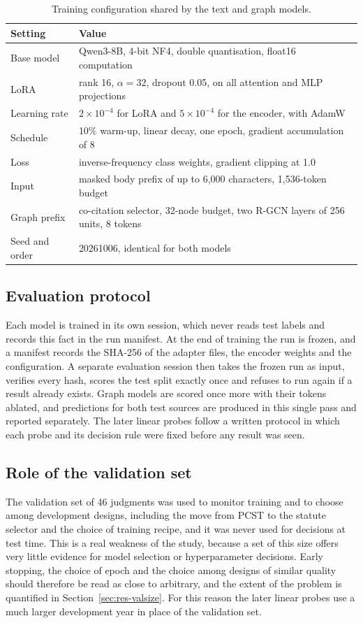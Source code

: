 \documentclass[journal]{IEEEtran}
\begin{document}
\begin{table}[!t]\centering\footnotesize
\caption{Training configuration shared by the text and graph models.}\label{tab:config}
\begin{tabular}{@{}lY{5.7cm}@{}}\toprule Setting & Value\\\midrule
Base model & Qwen3-8B, 4-bit NF4, double quantisation, float16 computation\\
LoRA & rank 16, $\alpha=32$, dropout 0.05, on all attention and MLP projections\\
Learning rate & $2\times10^{-4}$ for LoRA and $5\times10^{-4}$ for the encoder, with AdamW\\
Schedule & 10\% warm-up, linear decay, one epoch, gradient accumulation of 8\\
Loss & inverse-frequency class weights, gradient clipping at 1.0\\
Input & masked body prefix of up to 6,000 characters, 1,536-token budget\\
Graph prefix & co-citation selector, 32-node budget, two R-GCN layers of 256 units, 8 tokens\\
Seed and order & 20261006, identical for both models\\\bottomrule
\end{tabular}\end{table}

\subsection{Evaluation protocol}
Each model is trained in its own session, which never reads test labels and records this fact in the run manifest. At the end of training the run is frozen, and a manifest records the SHA-256 of the adapter files, the encoder weights and the configuration. A separate evaluation session then takes the frozen run as input, verifies every hash, scores the test split exactly once and refuses to run again if a result already exists. Graph models are scored once more with their tokens ablated, and predictions for both test sources are produced in this single pass and reported separately. The later linear probes follow a written protocol in which each probe and its decision rule were fixed before any result was seen.

\subsection{Role of the validation set}
The validation set of 46 judgments was used to monitor training and to choose among development designs, including the move from PCST to the statute selector and the choice of training recipe, and it was never used for decisions at test time. This is a real weakness of the study, because a set of this size offers very little evidence for model selection or hyperparameter decisions. Early stopping, the choice of epoch and the choice among designs of similar quality should therefore be read as close to arbitrary, and the extent of the problem is quantified in Section~\ref{sec:res-valsize}. For this reason the later linear probes use a much larger development year in place of the validation set.
\end{document}
